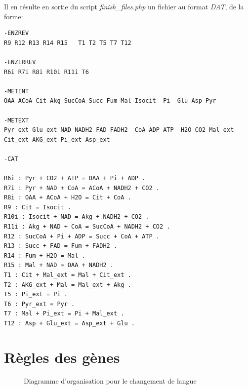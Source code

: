 Il en résulte en sortie du script \emph{finish\_files.php} un fichier au format \emph{DAT}, de la forme:
\\
\begin{DDbox}{\linewidth}
\begin{lstlisting}
-ENZREV
R9 R12 R13 R14 R15   T1 T2 T5 T7 T12

-ENZIRREV
R6i R7i R8i R10i R11i T6

-METINT
OAA ACoA Cit Akg SucCoA Succ Fum Mal Isocit  Pi  Glu Asp Pyr

-METEXT
Pyr_ext Glu_ext NAD NADH2 FAD FADH2  CoA ADP ATP  H2O CO2 Mal_ext Cit_ext AKG_ext Pi_ext Asp_ext

-CAT

R6i : Pyr + CO2 + ATP = OAA + Pi + ADP .
R7i : Pyr + NAD + CoA = ACoA + NADH2 + CO2 .
R8i : OAA + ACoA + H2O = Cit + CoA .
R9 : Cit = Isocit .
R10i : Isocit + NAD = Akg + NADH2 + CO2 .
R11i : Akg + NAD + CoA = SucCoA + NADH2 + CO2 .
R12 : SucCoA + Pi + ADP = Succ + CoA + ATP .
R13 : Succ + FAD = Fum + FADH2 .
R14 : Fum + H2O = Mal .
R15 : Mal + NAD = OAA + NADH2 .
T1 : Cit + Mal_ext = Mal + Cit_ext .
T2 : AKG_ext + Mal = Mal_ext + Akg .
T5 : Pi_ext = Pi .
T6 : Pyr_ext = Pyr .
T7 : Mal + Pi_ext = Pi + Mal_ext .
T12 : Asp + Glu_ext = Asp_ext + Glu .

\end{lstlisting}
\end{DDbox}

\section{Règles des gènes}

\begin{figure}[!ht]
	\begin{center}
		\caption{Diagramme d'organisation pour le changement de langue}
  		\label{DiagRegles}
  	\end{center}	
\end{figure}

